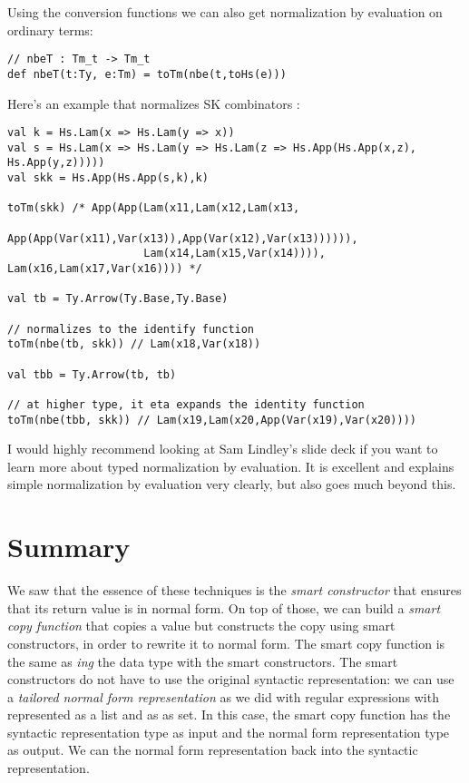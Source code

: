 Using the conversion functions we can also get normalization by evaluation on ordinary terms:

\begin{lstlisting}
// nbeT : Tm_t -> Tm_t
def nbeT(t:Ty, e:Tm) = toTm(nbe(t,toHs(e)))
\end{lstlisting}

Here's an example that normalizes SK combinators \cite{NbEwiki2021}:

\begin{lstlisting}
val k = Hs.Lam(x => Hs.Lam(y => x))
val s = Hs.Lam(x => Hs.Lam(y => Hs.Lam(z => Hs.App(Hs.App(x,z), Hs.App(y,z)))))
val skk = Hs.App(Hs.App(s,k),k)

toTm(skk) /* App(App(Lam(x11,Lam(x12,Lam(x13,
                  App(App(Var(x11),Var(x13)),App(Var(x12),Var(x13)))))),
                     Lam(x14,Lam(x15,Var(x14)))), Lam(x16,Lam(x17,Var(x16)))) */

val tb = Ty.Arrow(Ty.Base,Ty.Base)

// normalizes to the identify function
toTm(nbe(tb, skk)) // Lam(x18,Var(x18))

val tbb = Ty.Arrow(tb, tb)

// at higher type, it eta expands the identity function
toTm(nbe(tbb, skk)) // Lam(x19,Lam(x20,App(Var(x19),Var(x20))))
\end{lstlisting}

I would highly recommend looking at Sam Lindley's slide deck \cite{NbELindley2016slides} if you want to learn more about typed normalization by evaluation.
It is excellent and explains simple normalization by evaluation very clearly, but also goes much beyond this.

\section{Summary}

We saw that the essence of these techniques is the \emph{smart constructor} that ensures that its return value is in normal form.
On top of those, we can build a \emph{smart copy function}  that copies a value but constructs the copy using smart constructors, in order to rewrite it to normal form.
The smart copy function is the same as \emph{ing} the data type with the smart constructors.
The smart constructors do not have to use the original syntactic representation: we can use a \emph{tailored normal form representation} as we did with regular expressions with  represented as a list and  as as set.
In this case, the smart copy function has the syntactic representation type as input and the normal form representation type as output.
We can  the normal form representation back into the syntactic representation.

